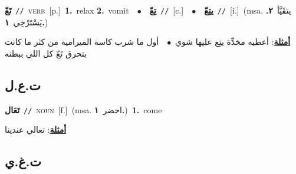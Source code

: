 \documentclass[10pt,a4paper,twoside]{article} %
\begin{document}
\begin{multicols}{2}
{\setlength\topsep{0pt}\textbf{\foreignlanguage{arabic}{تَعّ}}\ {\color{gray}\texttt{//}\color{black}}\ \textsc{verb}\ [p.]\ \textbf{1.}~relax  \textbf{2.}~vomit\ \ $\bullet$\ \ \setlength\topsep{0pt}\textbf{\foreignlanguage{arabic}{تِعّ}}\ {\color{gray}\texttt{//}\color{black}}\ [c.]\ \ $\bullet$\ \ \setlength\topsep{0pt}\textbf{\foreignlanguage{arabic}{يتِعّ}}\ {\color{gray}\texttt{//}\color{black}}\ [i.]\ \color{gray}(msa. \foreignlanguage{arabic}{يتقَيَّأ}~\foreignlanguage{arabic}{\textbf{٢.}}  \foreignlanguage{arabic}{يَسْتَرْخِي}~\foreignlanguage{arabic}{\textbf{١.}})\color{black}\  \begin{flushright}\color{gray}\foreignlanguage{arabic}{\textbf{\underline{\foreignlanguage{arabic}{أمثلة}}}: أعطيه مخدِّة يتِع عليها شوي\ $\bullet$\ \  أول ما شرب كاسة الميرامية من كثر ما كانت بتحرق تَعّ كل اللي ببطنه}\end{flushright}\color{black}} \vspace{2mm}

\vspace{-3mm}
\subsection*{\color{blue}\foreignlanguage{arabic}{ت.ع.ل}\color{blue}{}} 

{\setlength\topsep{0pt}\textbf{\foreignlanguage{arabic}{تَعَال}}\ {\color{gray}\texttt{//}\color{black}}\ \textsc{noun}\ [f.]\ \color{gray}(msa. \foreignlanguage{arabic}{احضر}~\foreignlanguage{arabic}{\textbf{١.}})\color{black}\ \textbf{1.}~come\  \begin{flushright}\color{gray}\foreignlanguage{arabic}{\textbf{\underline{\foreignlanguage{arabic}{أمثلة}}}: تعالي عندينا}\end{flushright}\color{black}} \vspace{2mm}

\vspace{-3mm}
\subsection*{\color{blue}\foreignlanguage{arabic}{ت.غ.ي}\color{blue}{}} 


\end{multicols}
\end{document}
